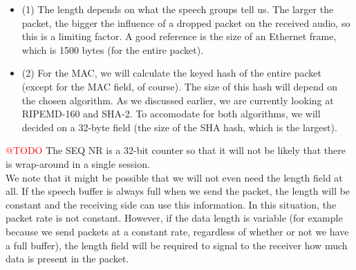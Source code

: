 \documentclass[a4paper]{article}
\begin{document}
\begin{itemize}
  \item (1) The length depends on what the speech groups tell us. The larger the packet, the bigger the influence of a dropped packet on the received audio, so this is a limiting factor. A good reference is the size of an Ethernet frame, which is 1500 bytes (for the entire packet).
  \item (2) For the MAC, we will calculate the keyed hash of the entire packet (except for the MAC field, of course). The size of this hash will depend on the chosen algorithm. As we discussed earlier, we are currently looking at RIPEMD-160 and SHA-2. To accomodate for both algorithms, we will decided on a 32-byte field (the size of the SHA hash, which is the largest). 
\end{itemize}

\textcolor{red}{@TODO} The SEQ NR is a 32-bit counter so that it will not be likely that there is wrap-around in a single session.\\

We note that it might be possible that we will not even need the length field at all. If the speech buffer is always full when we send the packet, the length will be constant and the receiving side can use this information. In this situation, the packet rate is not constant. However, if the data length is variable (for example because we send packets at a constant rate, regardless of whether or not we have a full buffer), the length field will be required to signal to the receiver how much data is present in the packet.
\end{document}
